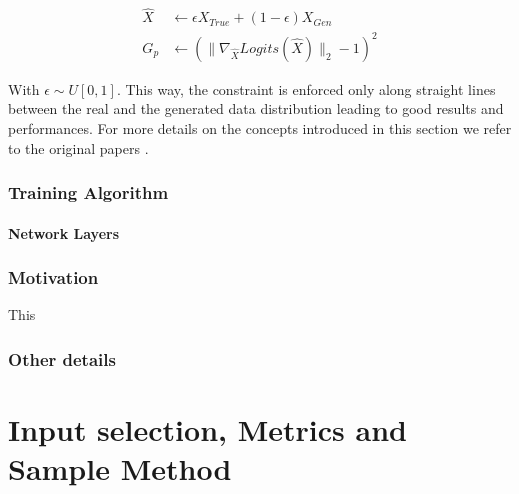 \begin{equation}
\label{eq:gp}
\begin{split}
\hat{X} & \gets \epsilon X_{True} + (1-\epsilon) X_{Gen} \\
G_p & \gets (\| \nabla_{\hat{X}}Logits(\hat{X}) \|_2 - 1 )^2
\end{split}
\end{equation}

With $ \epsilon \sim U[0,1] $. This way, the constraint is enforced only along straight lines between the real and the generated data distribution leading to good results and performances. For more details on the concepts introduced in this section we refer to the original papers \cite{wgan, wgangp}. 

\subsubsection{Training Algorithm}


\paragraph{Network Layers}


\subsubsection{Motivation} %
\label{sec:arch_advantages}

This 




\subsubsection{Other details} %



\section{Input selection, Metrics and Sample Method}
\label{sec:input_metrics_sample}
